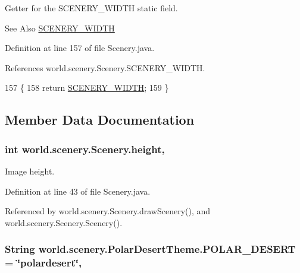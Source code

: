 Getter for the S\-C\-E\-N\-E\-R\-Y\-\_\-\-W\-I\-D\-T\-H static field. 

\begin{DoxySeeAlso}{See Also}
\hyperlink{classworld_1_1scenery_1_1_scenery_affb047c028883c6d069a03ef0f1caeb8}{S\-C\-E\-N\-E\-R\-Y\-\_\-\-W\-I\-D\-T\-H} 
\end{DoxySeeAlso}


Definition at line 157 of file Scenery.\-java.



References world.\-scenery.\-Scenery.\-S\-C\-E\-N\-E\-R\-Y\-\_\-\-W\-I\-D\-T\-H.


\begin{DoxyCode}
157                                         \{
158         \textcolor{keywordflow}{return} \hyperlink{classworld_1_1scenery_1_1_scenery_affb047c028883c6d069a03ef0f1caeb8}{SCENERY\_WIDTH};
159     \}
\end{DoxyCode}


\subsection{Member Data Documentation}
\hypertarget{classworld_1_1scenery_1_1_scenery_a54b4edfa060087e78a829105bf62a900}{
\subsubsection[{height}]{\setlength{\rightskip}{0pt plus 5cm}int world.\-scenery.\-Scenery.\-height\hspace{0.3cm}{\ttfamily [protected]}, {\ttfamily [inherited]}}}\label{classworld_1_1scenery_1_1_scenery_a54b4edfa060087e78a829105bf62a900}


Image height. 



Definition at line 43 of file Scenery.\-java.



Referenced by world.\-scenery.\-Scenery.\-draw\-Scenery(), and world.\-scenery.\-Scenery.\-Scenery().

\hypertarget{interfaceworld_1_1scenery_1_1_polar_desert_theme_a48dd1801e0146ea2306dadcbdee81b77}{
\subsubsection[{P\-O\-L\-A\-R\-\_\-\-D\-E\-S\-E\-R\-T}]{\setlength{\rightskip}{0pt plus 5cm}String world.\-scenery.\-Polar\-Desert\-Theme.\-P\-O\-L\-A\-R\-\_\-\-D\-E\-S\-E\-R\-T = \char`\"{}polardesert\char`\"{}\hspace{0.3cm}{\ttfamily [static]}, {\ttfamily [inherited]}}}\label{interfaceworld_1_1scenery_1_1_polar_desert_theme_a48dd1801e0146ea2306dadcbdee81b77}


